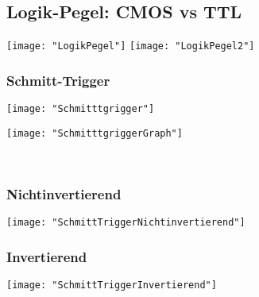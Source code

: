 
\subsection{Logik-Pegel: CMOS vs TTL}
\texttt{[image: "LogikPegel"]}
\texttt{[image: "LogikPegel2"]}


\subsubsection{Schmitt-Trigger}
\begin{minipage}[t]{0.3\textwidth}
	\vspace{0pt}
	\texttt{[image: "Schmitttgrigger"]}
\end{minipage}\hspace{0.05\textwidth}
\begin{minipage}[t]{0.3\textwidth}
	\vspace{0pt}
	\texttt{[image: "SchmitttgriggerGraph"]}
\end{minipage}\\
\begin{minipage}[t]{0.45\textwidth}
	\vspace{0pt}								%
	\subsubsection{Nichtinvertierend}
	\texttt{[image: "SchmittTriggerNichtinvertierend"]}
\end{minipage}\hspace{0.05\textwidth}
\begin{minipage}[t]{0.45\textwidth}
	\vspace{0pt}								%
	\subsubsection{Invertierend}
	\texttt{[image: "SchmittTriggerInvertierend"]}
\end{minipage}
\vspace{2mm}


